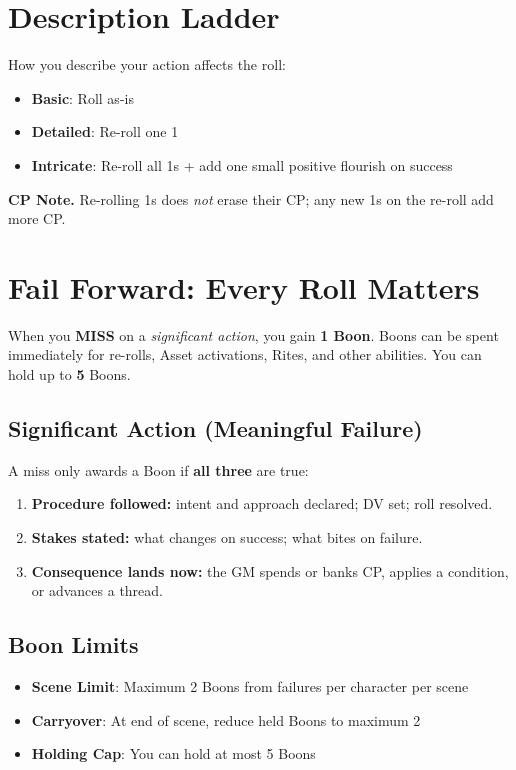 \documentclass[11pt]{article}
\begin{document}
\section{Description Ladder}

How you describe your action affects the roll:

\begin{itemize}
    \item \textbf{Basic}: Roll as-is
    \item \textbf{Detailed}: Re-roll one 1
    \item \textbf{Intricate}: Re-roll all 1s + add one small positive flourish on success
\end{itemize}

\noindent\textbf{CP Note.} Re-rolling 1s does \emph{not} erase their CP; any new 1s on the re-roll add more CP.

\section{Fail Forward: Every Roll Matters}

When you \textbf{MISS} on a \emph{significant action}, you gain \textbf{1 Boon}. Boons can be spent immediately for re-rolls, Asset activations, Rites, and other abilities. You can hold up to \textbf{5} Boons.

\subsection{Significant Action (Meaningful Failure)}
A miss only awards a Boon if \textbf{all three} are true:
\begin{enumerate}
  \item \textbf{Procedure followed:} intent and approach declared; DV set; roll resolved.
  \item \textbf{Stakes stated:} what changes on success; what bites on failure.
  \item \textbf{Consequence lands now:} the GM spends or banks CP, applies a condition, or advances a thread.
\end{enumerate}

\subsection{Boon Limits}
\begin{itemize}
    \item \textbf{Scene Limit}: Maximum 2 Boons from failures per character per scene
    \item \textbf{Carryover}: At end of scene, reduce held Boons to maximum 2
    \item \textbf{Holding Cap}: You can hold at most 5 Boons
\end{itemize}
\end{document}
